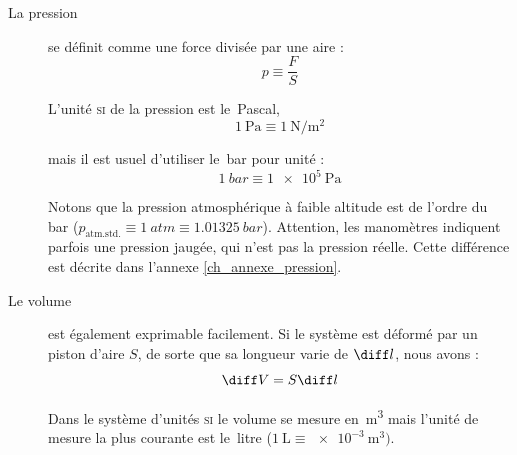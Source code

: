 		\clearfloats
		\begin{description}

			\item[La pression]{se définit comme une force divisée par une aire :
			\begin{equation}
				p \equiv \frac{F}{S}
				\label{def_pression}
			\end{equation}
		

			L’unité \textsc{si} de la pression est le~\si{Pascal},
			\begin{equation}
				\SI{1}{\pascal} \equiv \SI{1}{\newton\per\metre\squared}
			\end{equation}
		
			mais il est usuel d’utiliser le~\si{bar} pour unité :
			\begin{equation}
			\SI{1}{bar} \equiv \SI{1e5}{\pascal}
			\end{equation}

			Notons que la pression atmosphérique à faible altitude est de l’ordre du bar ($p_{\text{atm.std.}} \equiv \SI{1}{atm} \equiv \SI{1,01325}{bar}$). Attention, les manomètres indiquent parfois une pression jaugée, qui n’est pas la pression réelle. Cette différence est décrite dans l’annexe \ref{ch_annexe_pression}.
			}%

			\item[Le volume]{est également exprimable facilement. Si le système est déformé par un piston d’aire $S$, de sorte que sa longueur varie de $\diff l$, nous avons :
			\begin{equation}
			\diff V = S \diff l
			\label{eq_volume_surface_longueur}
			\end{equation}


			Dans le système d’unités \textsc{si} le volume se mesure en~\si{\metre\cubed} mais l’unité de mesure la plus courante est le~\si{litre} ($\SI{1}{\liter} \equiv \SI{e-3}{\metre\cubed})$.
			}%
		 
		\end{description}


